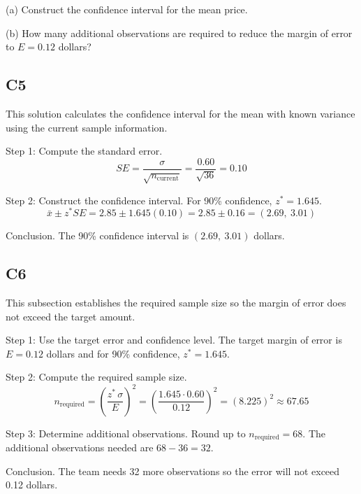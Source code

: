 \begin{ExamProblems}
		(a) Construct the confidence interval for the mean price.
		
		(b) How many additional observations are required to reduce the margin of error to $E = 0.12$ dollars?
		
		\subsection*{C5}
		This solution calculates the confidence interval for the mean with known variance using the current sample information.
		
		Step 1: Compute the standard error.
		\[
		SE = \frac{\sigma}{\sqrt{n_{\text{current}}}}
		= \frac{0.60}{\sqrt{36}}
		= 0.10
		\]
		
		Step 2: Construct the confidence interval. For 90\% confidence, $z^* = 1.645$.
		\[
		\bar{x} \pm z^* SE = 2.85 \pm 1.645(0.10)
		= 2.85 \pm 0.16
		= (2.69,\ 3.01)
		\]
		
		Conclusion. The 90\% confidence interval is $(2.69,\ 3.01)$ dollars.
		
		\subsection*{C6}
		This subsection establishes the required sample size so the margin of error does not exceed the target amount.
		
		Step 1: Use the target error and confidence level. The target margin of error is $E = 0.12$ dollars and for 90\% confidence, $z^* = 1.645$.
		
		Step 2: Compute the required sample size.
		\[
		n_{\text{required}} = \left(\frac{z^*\,\sigma}{E}\right)^2
		= \left(\frac{1.645 \cdot 0.60}{0.12}\right)^2
		= \left(8.225\right)^2
		\approx 67.65
		\]
		
		Step 3: Determine additional observations. Round up to $n_{\text{required}} = 68$. The additional observations needed are $68 - 36 = 32$.
		
		Conclusion. The team needs 32 more observations so the error will not exceed 0.12 dollars.
		
		
	\end{ExamProblems}

